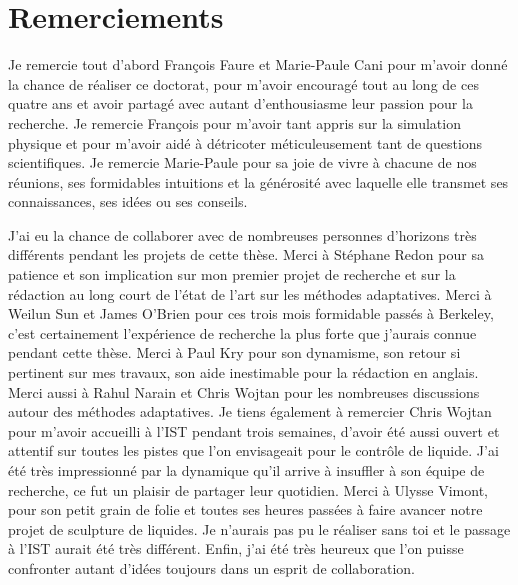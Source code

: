 \chapter*[Remerciements]{Remerciements}

Je remercie tout d'abord François Faure et Marie-Paule Cani pour m'avoir donné la chance de réaliser ce doctorat, 
pour m'avoir encouragé tout au long de ces quatre ans et avoir partagé avec autant d'enthousiasme leur passion pour la recherche.
Je remercie François pour m'avoir tant appris sur la simulation physique et pour m'avoir aidé à détricoter méticuleusement tant de questions scientifiques.
Je remercie Marie-Paule pour sa joie de vivre à chacune de nos réunions, ses formidables intuitions et la générosité avec laquelle elle transmet ses connaissances, ses idées ou ses conseils.

J'ai eu la chance de collaborer avec de nombreuses personnes d'horizons très différents pendant les projets de cette thèse.
Merci à Stéphane Redon pour sa patience et son implication sur mon premier projet de recherche et sur la rédaction au long court de l'état de l'art sur les méthodes adaptatives. Merci à Weilun Sun et James O'Brien pour ces trois mois formidable passés à Berkeley, c'est certainement l'expérience de recherche la plus forte que j'aurais connue pendant cette thèse. Merci à Paul Kry pour son dynamisme, son retour si pertinent sur mes travaux, son aide inestimable pour la rédaction en anglais. Merci aussi à Rahul Narain et Chris Wojtan pour les nombreuses discussions autour des méthodes adaptatives. Je tiens également à remercier Chris Wojtan pour m'avoir accueilli à l'IST pendant trois semaines, d'avoir été aussi ouvert et attentif sur toutes les pistes que l'on envisageait pour le contrôle de liquide. J'ai été très impressionné par la dynamique qu'il arrive à insuffler à son équipe de recherche, ce fut un plaisir de partager leur quotidien. Merci à Ulysse Vimont, pour son petit grain de folie et toutes ses heures passées à faire avancer notre projet de sculpture de liquides. Je n'aurais pas pu le réaliser sans toi et le passage à l'IST aurait été très différent. Enfin, j'ai été très heureux que l'on puisse confronter autant d'idées toujours dans un esprit de collaboration. 

